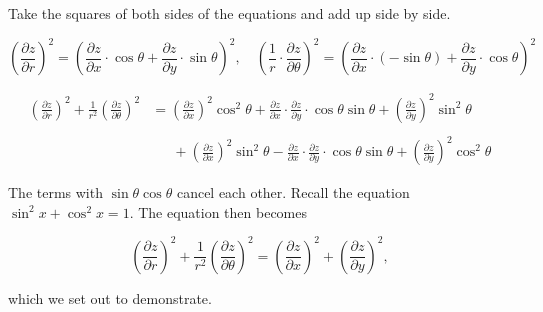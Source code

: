 \documentclass{article}
\begin{document}
\hfill

\noindent Take the squares of both sides of the equations and add up side by side.

\[\left(\frac{\partial z}{\partial r}\right)^2=\left(\frac{\partial z}{\partial x}\cdot\cos\theta+\frac{\partial z}{\partial y}\cdot\sin\theta\right)^2,\quad\left(\frac1r\cdot\frac{\partial z}{\partial\theta}\right)^2=\left(\frac{\partial z}{\partial x}\cdot(-\sin\theta)+\frac{\partial z}{\partial y}\cdot\cos\theta\right)^2\]

\hfill

\begin{align*}
\left(\frac{\partial z}{\partial r}\right)^2+\frac1{r^2}\left(\frac{\partial z}{\partial\theta}\right)^2&=\left(\frac{\partial z}{\partial x}\right)^2\cos^2\theta+\frac{\partial z}{\partial x}\cdot\frac{\partial z}{\partial y}\cdot\cos\theta\sin\theta+\left(\frac{\partial z}{\partial y}\right)^2\sin^2\theta\\\\&\quad\:\;+\left(\frac{\partial z}{\partial x}\right)^2\sin^2\theta-\frac{\partial z}{\partial x}\cdot\frac{\partial z}{\partial y}\cdot\cos\theta\sin\theta+\left(\frac{\partial z}{\partial y}\right)^2\cos^2\theta
\end{align*}

\hfill

\noindent The terms with $\sin\theta\cos\theta$ cancel each other. Recall the equation $\displaystyle \sin^2x+\cos^2x=1$. The equation then becomes

\[\left(\frac{\partial z}{\partial r}\right)^2+\frac1{r^2}\left(\frac{\partial z}{\partial\theta}\right)^2=\left(\frac{\partial z}{\partial x}\right)^2+\left(\frac{\partial z}{\partial y}\right)^2,\]

\hfill

\noindent which we set out to demonstrate.

\hfill
\end{document}
